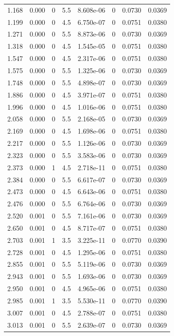 \documentclass[preview]{standalone}
\begin{document}
{{\begin{tabular}{L{1.2cm}C{1.2cm} C{0.3cm}C{0.5cm} C{1.4cm}C{1.4cm} C{1.4cm}C{1.4cm}}
  1.168  &  0.000  & 0     & 5.5 &  8.608e-06  & 0  & 0.0730 &  0.0369   \\ 
  1.199  &  0.000  & 0     & 4.5 &  6.750e-07  & 0  & 0.0751 &  0.0380   \\ 
  1.271  &  0.000  & 0     & 5.5 &  8.873e-06  & 0  & 0.0730 &  0.0369   \\ 
  1.318  &  0.000  & 0     & 4.5 &  1.545e-05  & 0  & 0.0751 &  0.0380   \\ 
  1.547  &  0.000  & 0     & 4.5 &  2.317e-06  & 0  & 0.0751 &  0.0380   \\ 
  1.575  &  0.000  & 0     & 5.5 &  1.325e-06  & 0  & 0.0730 &  0.0369   \\ 
  1.748  &  0.000  & 0     & 5.5 &  4.898e-07  & 0  & 0.0730 &  0.0369   \\ 
  1.886  &  0.000  & 0     & 4.5 &  3.971e-07  & 0  & 0.0751 &  0.0380   \\ 
  1.996  &  0.000  & 0     & 4.5 &  1.016e-06  & 0  & 0.0751 &  0.0380   \\ 
  2.058  &  0.000  & 0     & 5.5 &  2.168e-05  & 0  & 0.0730 &  0.0369   \\ 
  2.169  &  0.000  & 0     & 4.5 &  1.698e-06  & 0  & 0.0751 &  0.0380   \\ 
  2.217  &  0.000  & 0     & 5.5 &  1.126e-06  & 0  & 0.0730 &  0.0369   \\ 
  2.323  &  0.000  & 0     & 5.5 &  3.583e-06  & 0  & 0.0730 &  0.0369   \\ 
  2.373  &  0.000  & 1     & 4.5 &  2.718e-11  & 0  & 0.0751 &  0.0380   \\ 
  2.384  &  0.000  & 0     & 5.5 &  6.617e-07  & 0  & 0.0730 &  0.0369   \\ 
  2.473  &  0.000  & 0     & 4.5 &  6.643e-06  & 0  & 0.0751 &  0.0380   \\ 
  2.476  &  0.000  & 0     & 5.5 &  6.764e-06  & 0  & 0.0730 &  0.0369   \\ 
  2.520  &  0.001  & 0     & 5.5 &  7.161e-06  & 0  & 0.0730 &  0.0369   \\ 
  2.650  &  0.001  & 0     & 4.5 &  8.717e-07  & 0  & 0.0751 &  0.0380   \\ 
  2.703  &  0.001  & 1     & 3.5 &  3.225e-11  & 0  & 0.0770 &  0.0390   \\ 
  2.728  &  0.001  & 0     & 4.5 &  1.295e-06  & 0  & 0.0751 &  0.0380   \\ 
  2.855  &  0.001  & 0     & 5.5 &  5.119e-06  & 0  & 0.0730 &  0.0369   \\ 
  2.943  &  0.001  & 0     & 5.5 &  1.693e-06  & 0  & 0.0730 &  0.0369   \\ 
  2.950  &  0.001  & 0     & 4.5 &  4.965e-06  & 0  & 0.0751 &  0.0380   \\ 
  2.985  &  0.001  & 1     & 3.5 &  5.530e-11  & 0  & 0.0770 &  0.0390   \\ 
  3.007  &  0.001  & 0     & 4.5 &  2.788e-07  & 0  & 0.0751 &  0.0380   \\ 
  3.013  &  0.001  & 0     & 5.5 &  2.639e-07  & 0  & 0.0730 &  0.0369   \\ 
\hline 
\end{tabular} 

}}
\end{document}
